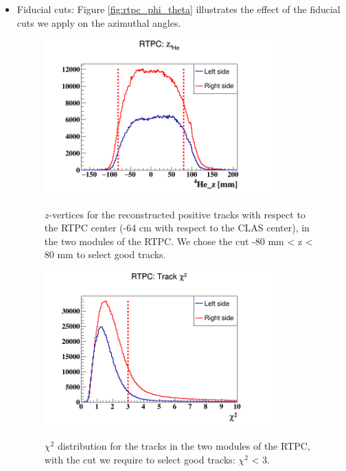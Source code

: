 \begin{itemize}
\item Fiducial cuts: Figure \ref{fig:rtpc_phi_theta} illustrates the effect of 
   the fiducial cuts we apply on the azimuthal angles. 

\begin{figure}[tbp]
\begin{minipage}[c]{.46\linewidth}
\hspace{-0.3in}
\includegraphics[height=6.0cm]{fig_analysis/rtpc_z.png}
\caption{ $z$-vertices for the reconstructed positive tracks with respect to 
the RTPC center (-64 cm with respect to the CLAS center), in the two modules of 
the RTPC. We chose the cut -80  mm < z < 80 mm to select good tracks.} 
\label{fig:rtpc_z}
\end{minipage} \hfill
\begin{minipage}[c]{.46\linewidth}
\hspace{-0.3in}
\includegraphics[height=6.0cm]{fig_analysis/rtpc_X2.png}
\caption{$\chi^{2}$ distribution for the tracks in the two modules of the RTPC, 
with the cut we require to select good tracks: $\chi^{2}$ < 3.}
\vspace{0.5in}
\label{fig:rtpc_X2}
\end{minipage}
\end{figure}


\end{itemize}
